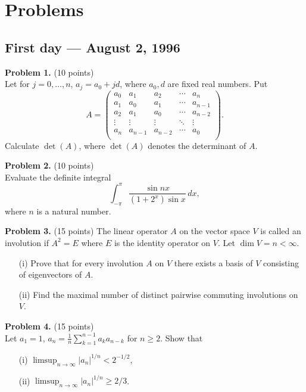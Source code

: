\documentclass{article}
\begin{document}
\pagestyle{plain}

\section*{Problems}

\subsection*{First day — August 2, 1996}

\textbf{Problem 1.} (10 points)\\
Let for $j = 0,\ldots,n$, $a_j = a_0 + jd$, where $a_0, d$ are fixed real numbers. Put
\[
A = \begin{pmatrix}
a_0 & a_1 & a_2 & \cdots & a_n \\
a_1 & a_0 & a_1 & \cdots & a_{n-1} \\
a_2 & a_1 & a_0 & \cdots & a_{n-2} \\
\vdots & \vdots & \vdots & \ddots & \vdots \\
a_n & a_{n-1} & a_{n-2} & \cdots & a_0 \\
\end{pmatrix}.
\]
Calculate $\det(A)$, where $\det(A)$ denotes the determinant of $A$.

\textbf{Problem 2.} (10 points)\\
Evaluate the definite integral
\[
\int_{-\pi}^{\pi} \frac{\sin nx}{(1 + 2^x)\sin x} \, dx,
\]
where \( n \) is a natural number.

\textbf{Problem 3.} (15 points)
The linear operator \( A \) on the vector space \( V \) is called an involution if \( A^2 = E \) where \( E \) is the identity operator on \( V \). Let \( \dim V = n < \infty \).
\begin{enumerate}
\item[(i)] Prove that for every involution \( A \) on \( V \) there exists a basis of \( V \) consisting of eigenvectors of \( A \).
\item[(ii)] Find the maximal number of distinct pairwise commuting involutions on \( V \).
\end{enumerate}

\textbf{Problem 4.} (15 points)\\
Let $a_1 = 1$, $a_n = \frac{1}{n} \sum_{k=1}^{n-1} a_k a_{n-k}$ for $n \geq 2$. Show that
\begin{itemize}
    \item[(i)] $\limsup_{n \to \infty} |a_n|^{1/n} < 2^{-1/2}$,
    \item[(ii)] $\limsup_{n \to \infty} |a_n|^{1/n} \geq 2/3$.
\end{itemize}
\end{document}
